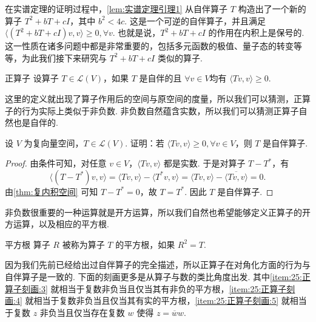在实谱定理的证明过程中，\autoref{lem:实谱定理引理1} 从自伴算子 $ T $ 构造出了一个新的算子 $ T^2 + bT + cI$，其中 $ b^2 < 4c $. 这是一个可逆的自伴算子，并且满足 $\langle (T^2 + bT + cI)v, v \rangle \geqslant 0, \forall v$. 也就是说，$ T^2 + bT + cI $ 的作用在内积上是保号的. 这一性质在诸多问题中都是非常重要的，包括多元函数的极值、量子态的转变等等，为此我们接下来研究与 $ T^2 + bT + cI $ 类似的算子.

\begin{definition}{正算子}{} 
    设算子 $ T \in \mathcal{L}(V) $，如果 $ T $ 是自伴的且 $ \forall v \in V $均有 $ \langle Tv, v \rangle \geqslant 0 $.
\end{definition}

这里的定义就出现了算子作用后的空间与原空间的度量，所以我们可以猜测，正算子的行为实际上类似于非负数. 非负数自然蕴含实数，所以我们可以猜测正算子自然也是自伴的.

\begin{example}{}{}
    设 $ V $ 为复向量空间，$ T \in \mathcal{L}(V) $. 证明：若 $\langle Tv, v \rangle \geqslant 0, \forall v \in V$，则 $ T $ 是自伴算子.
\end{example}

\begin{proof}
    由条件可知，对任意 $ v \in V $，$ \langle Tv, v \rangle $ 都是实数. 于是对算子 $ T - T^* $，有
    \[
        \langle (T - T^*)v, v \rangle = \langle Tv, v \rangle - \langle T^*v, v \rangle = \langle Tv, v \rangle - \overline{\langle Tv, v \rangle} = 0.
    \]
    由\autoref{thm:复内积空间} 可知 $ T - T^* = 0 $，故 $ T = T^* $. 因此 $ T $ 是自伴算子.
\end{proof}

非负数很重要的一种运算就是开方运算，所以我们自然也希望能够定义正算子的开方运算，以及相应的平方根.

\begin{definition}{平方根}{} 
    算子 $ R $ 被称为算子 $ T $ 的平方根，如果 $ R^{2} = T $.
\end{definition}

因为我们先前已经给出过自伴算子的完全描述，所以正算子在对角化方面的行为与自伴算子是一致的. 下面的刻画更多是从算子与数的类比角度出发. 其中\ref*{item:25:正算子刻画:3} 就相当于复数非负当且仅当其有非负的平方根，\ref*{item:25:正算子刻画:4} 就相当于复数非负当且仅当其有实的平方根，\ref*{item:25:正算子刻画:5} 就相当于复数 $ z $ 非负当且仅当存在复数 $ w $ 使得 $ z = \overline{w}w $.

